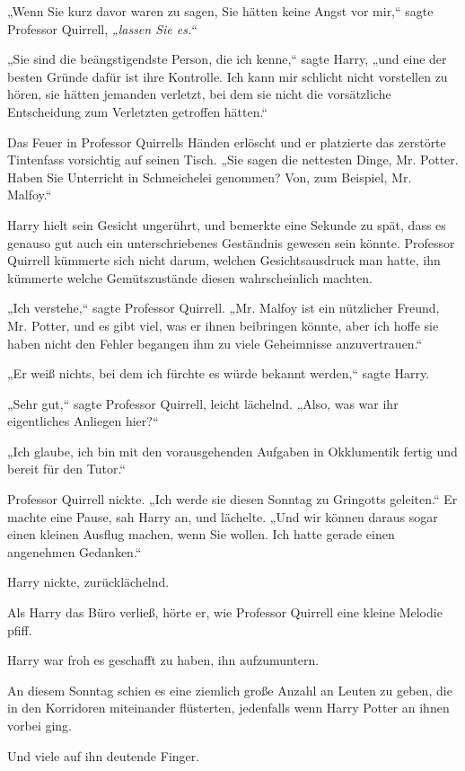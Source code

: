 {„Wenn Sie kurz davor waren zu sagen, Sie hätten keine Angst vor mir,“ sagte Professor Quirrell, \emph{„lassen Sie es.“}

„Sie sind die beängstigendste Person, die ich kenne,“ sagte Harry, „und eine der besten Gründe dafür ist ihre Kontrolle. Ich kann mir schlicht nicht vorstellen zu hören, sie hätten jemanden verletzt, bei dem sie nicht die vorsätzliche Entscheidung zum Verletzten getroffen hätten.“

Das Feuer in Professor Quirrells Händen erlöscht und er platzierte das zerstörte Tintenfass vorsichtig auf seinen Tisch. „Sie sagen die nettesten Dinge, Mr. Potter. Haben Sie Unterricht in Schmeichelei genommen? Von, zum Beispiel, Mr. Malfoy.“

Harry hielt sein Gesicht ungerührt, und bemerkte eine Sekunde zu spät, dass es genauso gut auch ein unterschriebenes Geständnis gewesen sein könnte. Professor Quirrell kümmerte sich nicht darum, welchen Gesichtsausdruck man hatte, ihn kümmerte welche Gemütszustände diesen wahrscheinlich machten.

„Ich verstehe,“ sagte Professor Quirrell. „Mr. Malfoy ist ein nützlicher Freund, Mr. Potter, und es gibt viel, was er ihnen beibringen könnte, aber ich hoffe sie haben nicht den Fehler begangen ihm zu viele Geheimnisse anzuvertrauen.“

„Er weiß nichts, bei dem ich fürchte es würde bekannt werden,“ sagte Harry.

„Sehr gut,“ sagte Professor Quirrell, leicht lächelnd. „Also, was war ihr eigentliches Anliegen hier?“

„Ich glaube, ich bin mit den vorausgehenden Aufgaben in Okklumentik fertig und bereit für den Tutor.“

Professor Quirrell nickte. „Ich werde sie diesen Sonntag zu Gringotts geleiten.“ Er machte eine Pause, sah Harry an, und lächelte. „Und wir können daraus sogar einen kleinen Ausflug machen, wenn Sie wollen. Ich hatte gerade einen angenehmen Gedanken.“

Harry nickte, zurücklächelnd.

Als Harry das Büro verließ, hörte er, wie Professor Quirrell eine kleine Melodie pfiff.

Harry war froh es geschafft zu haben, ihn aufzumuntern.

An diesem Sonntag schien es eine ziemlich große Anzahl an Leuten zu geben, die in den Korridoren miteinander flüsterten, jedenfalls wenn Harry Potter an ihnen vorbei ging.

Und viele auf ihn deutende Finger.

}
